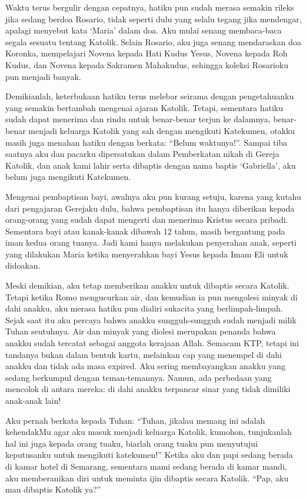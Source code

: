Waktu terus bergulir dengan cepatnya, hatiku pun sudah merasa semakin rileks jika sedang berdoa Rosario, tidak seperti dulu yang selalu tegang jika mendengar, apalagi menyebut kata ‘Maria’ dalam doa. Aku mulai senang membaca-baca segala sesuatu tentang Katolik.
Selain Rosario, aku juga senang mendaraskan doa Koronka, mempelajari Novena kepada Hati Kudus Yesus, Novena kepada Roh Kudus, dan Novena kepada Sakramen Mahakudus, sehingga koleksi Rosarioku pun menjadi banyak.

Demikianlah, keterbukaan hatiku terus melebar seirama dengan pengetahuanku yang semakin bertambah mengenai ajaran Katolik. Tetapi, sementara hatiku sudah dapat menerima dan rindu untuk benar-benar terjun ke dalamnya, benar-benar menjadi keluarga Katolik yang sah dengan mengikuti Katekumen, otakku masih juga menahan hatiku dengan berkata: “Belum waktunya!”.
Sampai tiba saatnya aku dan pacarku dipersatukan dalam Pemberkatan nikah di Gereja Katolik, dan anak kami lahir serta dibaptis dengan nama baptis ‘Gabriella’, aku belum juga mengikuti Katekumen.

Mengenai pembaptisan bayi, awalnya aku pun kurang setuju, karena yang kutahu dari pengajaran Gerejaku dulu, bahwa pembaptisan itu hanya diberikan kepada orang-orang yang sudah dapat mengerti dan menerima Kristus secara pribadi. Sementara bayi atau kanak-kanak dibawah 12 tahun, masih bergantung pada iman kedua orang tuanya. Jadi kami hanya melakukan penyerahan anak, seperti yang dilakukan Maria ketika menyerahkan bayi Yesus kepada Imam Eli untuk didoakan.

Meski demikian, aku tetap memberikan anakku untuk dibaptis secara Katolik. Tetapi ketika Romo mengucurkan air, dan kemudian ia pun mengolesi minyak di dahi anakku, aku merasa hatiku pun dialiri sukacita yang berlimpah-limpah. Sejak saat itu aku percaya bahwa anakku sungguh-sungguh sudah menjadi milik Tuhan seutuhnya. Air dan minyak yang diolesi merupakan penanda bahwa anakku sudah tercatat sebagai anggota kerajaan Allah. Semacam KTP, tetapi ini tandanya bukan dalam bentuk kartu, melainkan cap yang menempel di dahi anakku dan tidak ada masa expired.
Aku sering membayangkan anakku yang sedang berkumpul dengan teman-temannya. Namun, ada perbedaan yang mencolok di antara mereka: di dahi anakku terpancar sinar yang tidak dimiliki anak-anak lain!

Aku pernah berkata kepada Tuhan: “Tuhan, jikalau memang ini adalah kehendakMu agar aku masuk menjadi keluarga Katolik, kumohon, tunjukanlah hal ini juga kepada orang tuaku, biarlah orang tuaku pun menyutujui keputusanku untuk mengikuti katekumen!”
Ketika aku dan papi sedang berada di kamar hotel di Semarang, sementara mami sedang berada di kamar mandi, aku memberanikan diri untuk meminta ijin dibaptis secara Katolik. “Pap, aku mau dibaptis Katolik ya?”

